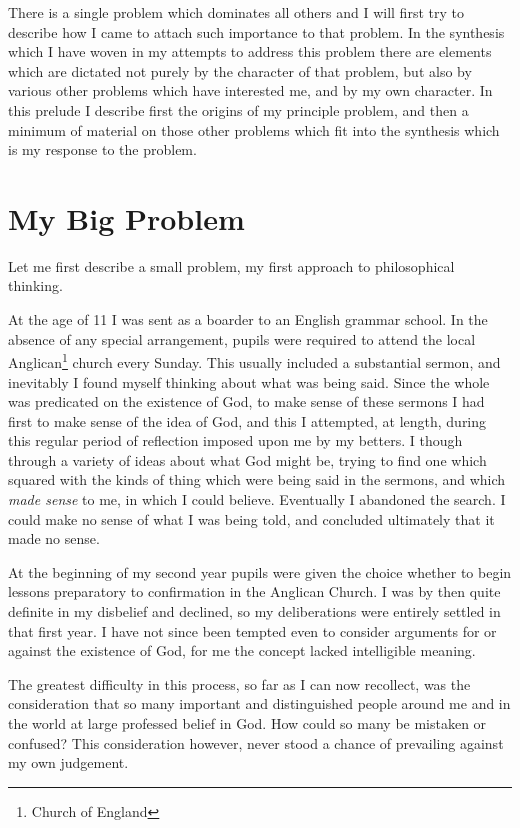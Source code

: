 There is a single problem which dominates all others and I will first try to describe how I came to attach such importance to that problem.
In the synthesis which I have woven in my attempts to address this problem there are elements which are dictated not purely by the character of that problem, but also by various other problems which have interested me, and by my own character.
In this prelude I describe first the origins of my principle problem, and then a minimum of material on those other problems which fit into the synthesis which is my response to the problem.

\section{My Big Problem}

Let me first describe a small problem, my first approach to philosophical thinking.

At the age of 11 I was sent as a boarder to an English grammar school.
In the absence of any special arrangement, pupils were required to attend the local Anglican\footnote{
Church of England} church every Sunday.
This usually included a substantial sermon, and inevitably I found myself thinking about what was being said.
Since the whole was predicated on the existence of God, to make sense of these sermons I had first to make sense of the idea of God, and this I attempted, at length, during this regular period of reflection imposed upon me by my betters.
I though through a variety of ideas about what God might be, trying to find one which squared with the kinds of thing which were being said in the sermons, and which {\it made sense} to me, in which I could believe.
Eventually I abandoned the search.
I could make no sense of what I was being told, and concluded ultimately that it made no sense.

At the beginning of my second year pupils were given the choice whether to begin lessons preparatory to confirmation in the Anglican Church.
I was by then quite definite in my disbelief and declined, so my deliberations were entirely settled in that first year.
I have not since been tempted even to consider arguments for or against the existence of God, for me the concept lacked intelligible meaning.

The greatest difficulty in this process, so far as I can now recollect, was the consideration that so many important and distinguished people around me and in the world at large professed belief in God.
How could so many be mistaken or confused?
This consideration however, never stood a chance of prevailing against my own judgement.

